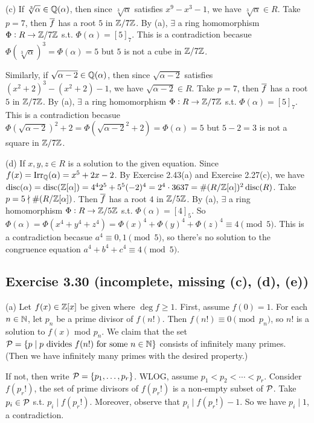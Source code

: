 \documentclass[../Marcus.tex]{subfiles}
\begin{document}
(c) If $\sqrt[3]{\alpha}\in\mathbb{Q}(\alpha)$, then since $\sqrt[3]{\alpha}$ satisfies $x^9-x^3-1$, we have $\sqrt[3]{\alpha}\in R$. Take $p=7$, then $\overline{f}$ has a root $5$ in $\mathbb{Z}/7\mathbb{Z}$. By (a), $\exists$ a ring homomorphism $\Phi:R\to\mathbb{Z}/7\mathbb{Z}$ s.t. $\Phi(\alpha)=[5]_7$. This is a contradiction becasue $\Phi(\sqrt[3]{\alpha})^3=\Phi(\alpha)=5$ but $5$ is not a cube in $\mathbb{Z}/7\mathbb{Z}$.

Similarly, if $\sqrt{\alpha-2}\in\mathbb{Q}(\alpha)$, then since $\sqrt{\alpha-2}$ satisfies $(x^2+2)^3-(x^2+2)-1$, we have $\sqrt{\alpha-2}\in R$. Take $p=7$, then $\overline{f}$ has a root $5$ in $\mathbb{Z}/7\mathbb{Z}$. By (a), $\exists$ a ring homomorphism $\Phi:R\to\mathbb{Z}/7\mathbb{Z}$ s.t. $\Phi(\alpha)=[5]_7$. This is a contradiction becasue $\Phi(\sqrt{\alpha-2})^2+2=\Phi(\sqrt{\alpha-2}^2+2)=\Phi(\alpha)=5$ but $5-2=3$ is not a square in $\mathbb{Z}/7\mathbb{Z}$.

(d) If $x,y,z\in R$ is a solution to the given equation. Since $f(x)=\operatorname{Irr}_{\mathbb{Q}}(\alpha)=x^5+2x-2$. By Exercise 2.43(a) and Exercise 2.27(c), we have $\operatorname{disc}(\alpha)=\operatorname{disc}(\mathbb{Z}[\alpha])=4^42^5+5^5(-2)^4=2^4\cdot 3637=\#(R/\mathbb{Z}[\alpha])^2\operatorname{disc}(R)$. Take $p=5\nmid \#(R/\mathbb{Z}[\alpha])$. Then $\overline{f}$ has a root $4$ in $\mathbb{Z}/5\mathbb{Z}$. By (a), $\exists$ a ring homomorphism $\Phi:R\to\mathbb{Z}/5\mathbb{Z}$ s.t. $\Phi(\alpha)=[4]_5$. So $\Phi(\alpha)=\Phi(x^4+y^4+z^4)=\Phi(x)^4+\Phi(y)^4+\Phi(z)^4\equiv 4\pmod{5}$. This is a contradiction becasue $a^4\equiv 0,1 \pmod{5}$, so there's no solution to the congruence equation $a^4+b^4+c^4\equiv 4\pmod{5}$.

\subsection*{Exercise 3.30 \color{red}(incomplete, missing (c), (d), (e))}

(a) Let $f(x)\in\mathbb{Z}[x]$ be given where $\deg f\geq1$. First, assume $f(0)=1$. For each $n\in\mathbb{N}$, let $p_n$ be a prime divisor of $f(n!)$. Then $f(n!)\equiv 0 \pmod{p_n}$, so $n!$ is a solution to $f(x)$ mod $p_n$. We claim that the set $\mathcal{P}=\{ p \mid p \text{ divides } f(n!) \text{ for some } n\in\mathbb{N}\}$ consists of infinitely many primes. (Then we have infinitely many primes with the desired property.)

If not, then write $\mathcal{P}=\{p_1,\ldots,p_r\}$. WLOG, assume $p_1<p_2<\cdots<p_r$. Consider $f(p_r!)$, the set of prime divisors of $f(p_r!)$ is a non-empty subset of $\mathcal{P}$. Take $p_i\in\mathcal{P}$ s.t. $p_i\mid f(p_r!)$. Moreover, observe that $p_i\mid f(p_r!)-1$. So we have $p_i\mid 1$, a contradiction.
\end{document}
